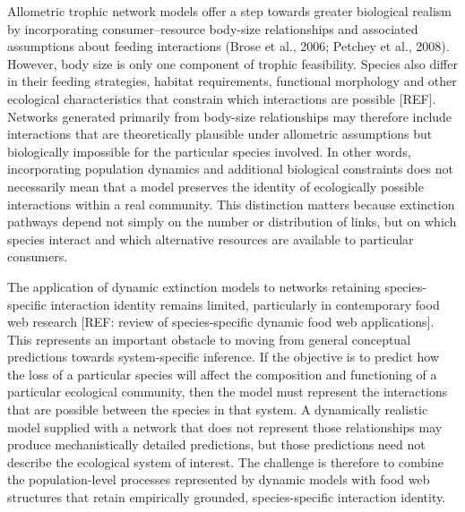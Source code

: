 \documentclass[
]{article}
\begin{document}
Allometric trophic network models offer a step towards greater
biological realism by incorporating consumer--resource body-size
relationships and associated assumptions about feeding interactions
(Brose et al., 2006; Petchey et al., 2008). However, body size is only
one component of trophic feasibility. Species also differ in their
feeding strategies, habitat requirements, functional morphology and
other ecological characteristics that constrain which interactions are
possible {[}REF{]}. Networks generated primarily from body-size
relationships may therefore include interactions that are theoretically
plausible under allometric assumptions but biologically impossible for
the particular species involved. In other words, incorporating
population dynamics and additional biological constraints does not
necessarily mean that a model preserves the identity of ecologically
possible interactions within a real community. This distinction matters
because extinction pathways depend not simply on the number or
distribution of links, but on which species interact and which
alternative resources are available to particular consumers.

The application of dynamic extinction models to networks retaining
species-specific interaction identity remains limited, particularly in
contemporary food web research {[}REF: review of species-specific
dynamic food web applications{]}. This represents an important obstacle
to moving from general conceptual predictions towards system-specific
inference. If the objective is to predict how the loss of a particular
species will affect the composition and functioning of a particular
ecological community, then the model must represent the interactions
that are possible between the species in that system. A dynamically
realistic model supplied with a network that does not represent those
relationships may produce mechanistically detailed predictions, but
those predictions need not describe the ecological system of interest.
The challenge is therefore to combine the population-level processes
represented by dynamic models with food web structures that retain
empirically grounded, species-specific interaction identity.
\end{document}
